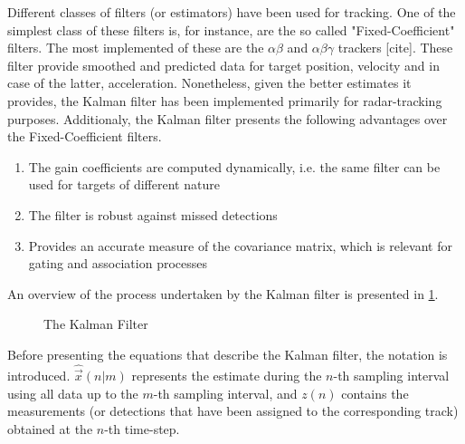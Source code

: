 Different classes of filters (or estimators) have been used for tracking. One of the simplest class of these filters is, for instance, are the so called "Fixed-Coefficient" filters. The most implemented of these are the $\alpha\beta$ and $\alpha\beta\gamma$ trackers [cite]. These filter provide smoothed and predicted data for target position, velocity and in case of the latter, acceleration.  Nonetheless, given the better estimates it provides, the Kalman filter has been implemented primarily for radar-tracking purposes. Additionaly, the Kalman filter presents the following advantages over the Fixed-Coefficient filters.
\begin{enumerate}
	\item The gain coefficients are computed dynamically, i.e. the same filter can be used for targets of different nature
	\item The filter is robust against missed detections
	\item Provides an accurate measure of the covariance matrix, which is relevant for gating and association processes
\end{enumerate}
An overview of the process undertaken by the Kalman filter is presented in \cref{fig:kalman}.
\begin{figure}[h]
	\centering
	
	\caption{The Kalman Filter}
	\label{fig:kalman}
\end{figure} 
Before presenting the equations that describe the Kalman filter, the notation is introduced. $\hat{\vec{x}}(n|m)$ represents the estimate during the $n$-th sampling interval using all data up to the $m$-th sampling interval, and $z(n)$ contains the measurements (or detections that have been assigned to the corresponding track) obtained at the $n$-th time-step. 
